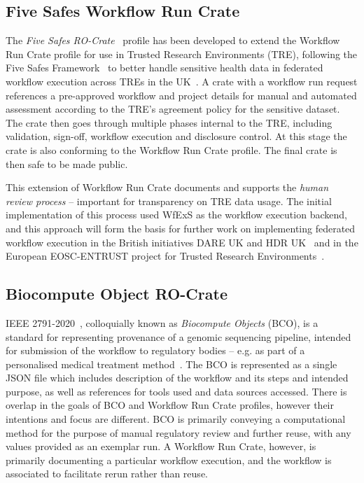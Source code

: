 \documentclass[10pt,letterpaper]{article}
\begin{document}
\subsection{Five Safes Workflow Run Crate}\label{trusted-workflow-run-crate}

The \emph{Five Safes RO-Crate}~\cite{5s-crate} profile has been developed to extend the Workflow Run Crate profile for use in Trusted Research Environments (TRE), following the Five Safes Framework~\cite{Desai 2016} to better handle sensitive health data in federated workflow execution across TREs in the UK~\cite{trefx}.
A crate with a workflow run request references a pre-approved workflow and project details for manual and automated assessment according to the TRE's agreement policy for the sensitive dataset.
%
The crate then goes through multiple phases internal to the TRE, including validation, sign-off, workflow execution and disclosure control.
At this stage the crate is also conforming to the Workflow Run Crate profile.
The final crate is then safe to be made public.

This extension of Workflow Run Crate documents and supports the \emph{human review process} -- important for transparency on TRE data usage. 
The initial implementation of this process used WfExS as the workflow execution backend, and this approach will form the basis for further work on implementing federated workflow execution in the British initiatives DARE UK and HDR UK~\cite{Snowley 2023} and in the European EOSC-ENTRUST project for Trusted Research Environments~\cite{eosc-entrust}.


\subsection{Biocompute Object RO-Crate}\label{bco-crate}
IEEE 2791-2020~\cite{Mazumder 2020}, colloquially known as \emph{Biocompute Objects} (BCO), is a standard for representing provenance of a genomic sequencing pipeline, intended for submission of the workflow to regulatory bodies -- e.g. as part of a personalised medical treatment method~\cite{Alterovitz 2018}.
The BCO is represented as a single JSON file which includes description of the workflow and its steps and intended purpose, as well as references for tools used and data sources accessed. 
There is overlap in the goals of BCO and Workflow Run Crate profiles, however their intentions and focus are different. 
BCO is primarily conveying a computational method for the purpose of manual regulatory review and further reuse, with any values provided as an exemplar run.  
A Workflow Run Crate, however, is primarily documenting a particular workflow execution, and the workflow is associated to facilitate rerun rather than reuse. 
\end{document}
